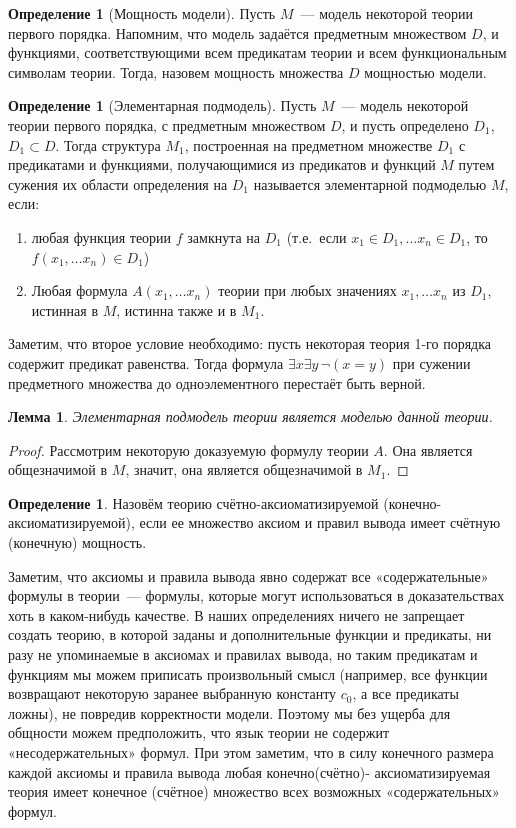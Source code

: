 \documentclass[a4paper,11pt]{article}
\newtheorem{lmm}[thm]{Лемма}
\theoremstyle{definition}
\newtheorem{dfn}[thm]{Определение}
\begin{document}
\begin{dfn}[Мощность модели]
Пусть $M$~--- модель некоторой теории первого порядка. Напомним, что модель
задаётся предметным множеством $D$, и функциями, соответствующими всем
предикатам теории и всем функциональным символам теории. Тогда, назовем
мощность множества $D$ мощностью модели.
\end{dfn}

\begin{dfn}[Элементарная подмодель]
Пусть $M$~--- модель некоторой теории первого порядка, с предметным множеством
$D$, и пусть определено $D_1$, $D_1 \subset D$. Тогда структура $M_1$,
построенная на предметном множестве $D_1$ с предикатами и функциями,
получающимися из предикатов и функций $M$ путем сужения их области определения
на $D_1$ называется элементарной подмоделью $M$, если:
\begin{enumerate}
\item любая функция теории $f$ замкнута на $D_1$ (т.е.\ если $x_1 \in D_1,
  \dots x_n \in D_1$, то $f(x_1, \dots x_n) \in D_1$)
\item Любая формула $A(x_1, \dots x_n)$ теории при любых значениях $x_1, \dots
  x_n$ из $D_1$, истинная в $M$, истинна также и в $M_1$.
\end{enumerate}
\end{dfn}

Заметим, что второе условие необходимо: пусть некоторая теория 1-го порядка
содержит предикат равенства. Тогда формула $\exists x\exists y\,\neg(x = y)$ при
сужении предметного множества до одноэлементного перестаёт быть верной.

\begin{lmm}
Элементарная подмодель теории является моделью данной теории.
\end{lmm}
\begin{proof}
Рассмотрим некоторую доказуемую формулу теории $A$. Она является общезначимой в
$M$, значит, она является общезначимой в $M_1$.
\end{proof}

\begin{dfn}
Назовём теорию счётно-аксиоматизируемой (конечно-аксиоматизируемой), если ее
множество аксиом и правил вывода имеет счётную (конечную) мощность.
\end{dfn}

Заметим, что аксиомы и правила вывода явно содержат все «содержательные»
формулы в теории~--- формулы, которые могут использоваться в доказательствах хоть
в каком-нибудь качестве. В наших определениях ничего не запрещает создать
теорию, в которой заданы и дополнительные функции и предикаты, ни разу не
упоминаемые в аксиомах и правилах вывода, но таким предикатам и функциям мы
можем приписать произвольный смысл (например, все функции возвращают некоторую
заранее выбранную константу $c_0$, а все предикаты ложны), не повредив
корректности модели. Поэтому мы без ущерба для общности можем предположить, что
язык теории не содержит «несодержательных» формул. При этом заметим, что в силу
конечного размера каждой аксиомы и правила вывода любая конечно(счётно)-
аксиоматизируемая теория имеет конечное (счётное) множество всех возможных
«содержательных» формул.
\end{document}
